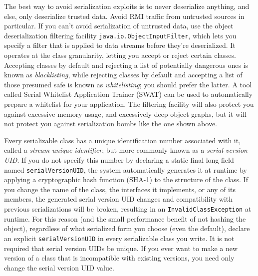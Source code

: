 \documentclass[8pt, table, xcdraw]{article}%
\begin{document}
The best way to avoid serialization exploits is to never deserialize anything, and else, only deserialize trusted data. Avoid RMI traffic from untrusted sources in particular. If you can’t avoid serialization of untrusted data, use the object deserialization filtering facility \lstinline{java.io.ObjectInputFilter}, which lets you specify a filter that is applied to data streams before they’re deserialized. It operates at the class granularity, letting you accept or reject certain classes. Accepting classes by default and rejecting a list of potentially dangerous ones is known as \emph{blacklisting}, while rejecting classes by default and accepting a list of those presumed safe is known as \emph{whitelisting}; you should prefer the latter. A tool called Serial Whitelist Application Trainer (SWAT) can be used to automatically prepare a whitelist for your application. The filtering facility will also protect you against excessive memory usage, and excessively deep object graphs, but it will not protect you against serialization bombs like the one shown above.

Every serializable class has a unique identification number associated with it, called a \emph{stream unique identifier}, but more commonly known as a \emph{serial version UID}. If you do not specify this number by declaring a static final long field named
\lstinline{serialVersionUID}, the system automatically generates it at runtime by applying a cryptographic hash function (SHA-1) to the structure of the class. If you change the name of the class, the interfaces it implements, or any of its members, the generated
serial version UID changes and compatibility with previous serializations will be broken, resulting in an \lstinline{InvalidClassException} at runtime. For this reason (and the small performance benefit of not hashing the object), regardless of what serialized form you choose (even the default), declare an explicit \lstinline{serialVersionUID} in every serializable class you write. It is not required that serial version UIDs be unique. If you ever want to make a new version of a class that is incompatible with existing versions, you need only change the serial version UID value.
\end{document}
